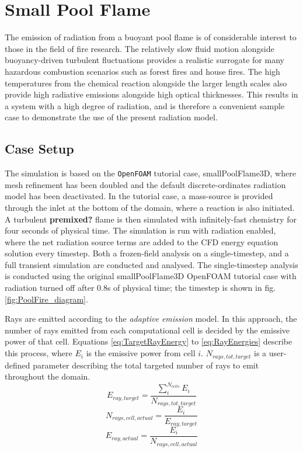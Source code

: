 \section{Small Pool Flame}\label{section:SmallPoolFlame}
The emission of radiation from a buoyant pool flame is of considerable interest to those in the field of fire research. 
The relatively slow fluid motion alongside buoyancy-driven turbulent fluctuations provides a realistic surrogate for many hazardous combustion scenarios such as forest fires and house fires.
The high temperatures from the chemical reaction alongside the larger length scales also provide high radiative emissions alongside high optical thicknesses. 
This results in a system with a high degree of radiation, and is therefore a convenient sample case to demonstrate the use of the present radiation model.

\subsection{Case Setup}
The simulation is based on the \verb|OpenFOAM| tutorial case, smallPoolFlame3D, where mesh refinement has been doubled and the default discrete-ordinates radiation model has been deactivated. 
In the tutorial case, a mass-source is provided through the inlet at the bottom of the domain, where a reaction is also initiated. A turbulent \textbf{premixed?} flame is then simulated with infinitely-fast chemistry for four seconds of physical time.
The simulation is run with radiation enabled, where the net radiation source terms are added to the CFD energy equation solution every timestep.
Both a frozen-field analysis on a single-timestep, and a full transient simulation are conducted and analysed. The single-timestep analysis is conducted using the original smallPoolFlame3D OpenFOAM tutorial case with radiation turned off after 0.8s of physical time; the timestep is shown in fig. \ref{fig:PoolFire_diagram}.

Rays are emitted according to the \textit{adaptive emission} model. In this approach, the number of rays emitted from each computational cell is decided by the emissive power of that cell. Equations \ref{eq:TargetRayEnergy} to \ref{eq:RayEnergies} describe this process, where $E_i$ is the emissive power from cell $i$. 
$N_{rays,tot,target}$ is a user-defined parameter describing the total targeted number of rays to emit throughout the domain.
\begin{equation}
    E_{ray,target}=\frac{\sum^{N_{cells}}_{i}E_{i}}{N_{rays,tot,target}}
    \label{eq:TargetRayEnergy}
\end{equation}
\begin{equation}
    N_{rays,cell,actual}=\frac{E_{i}}{E_{ray,target}}
    \label{eq:NumberOfRays}
\end{equation}
\begin{equation}
    E_{ray,actual}=\frac{E_{i}}{N_{rays,cell,actual}}
    \label{eq:RayEnergies}
\end{equation}


